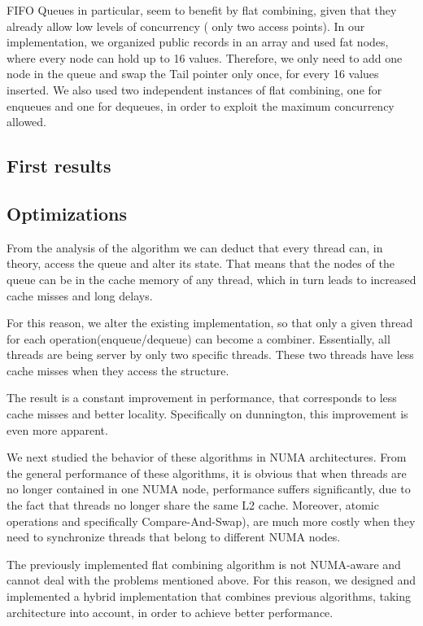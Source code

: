 FIFO Queues in particular, seem to benefit by flat combining, given that they already allow low levels of concurrency ( only two access points). In our implementation, we organized public records in an array and used fat nodes, where every node can hold up to 16 values. Therefore, we only need to add one node in the queue and swap the Tail pointer only once, for every 16 values inserted. We also used two independent instances of flat combining, one for enqueues and one for dequeues, in order to exploit the maximum concurrency allowed.

\subsection{First results}
 
\subsection{Optimizations}
From the analysis of the algorithm we can deduct that every thread can, in theory, access the queue and alter its state. That means that the nodes of the queue can be in the cache memory of any thread, which in turn leads to increased cache misses and long delays.

For this reason, we alter the existing implementation, so that only a given thread for each operation(enqueue/dequeue) can become a combiner. Essentially, all threads are being server by only two specific threads. These two threads have less cache misses when they access the structure.

The result is a constant improvement in performance, that corresponds  to less cache misses and better locality. Specifically on dunnington, this improvement is even more apparent.

We next  studied the behavior of these algorithms in NUMA architectures. From the general performance of these algorithms, it is obvious that when threads are no longer contained in one NUMA node, performance suffers significantly, due to the fact that threads no longer share the same L2 cache. Moreover, atomic operations and specifically Compare-And-Swap), are much more costly when they need to synchronize threads that belong to different NUMA nodes.

The previously implemented flat combining algorithm is not NUMA-aware and cannot deal with the problems mentioned above. For this reason, we designed and implemented a hybrid implementation that combines previous algorithms, taking architecture into account, in order to achieve better performance.

